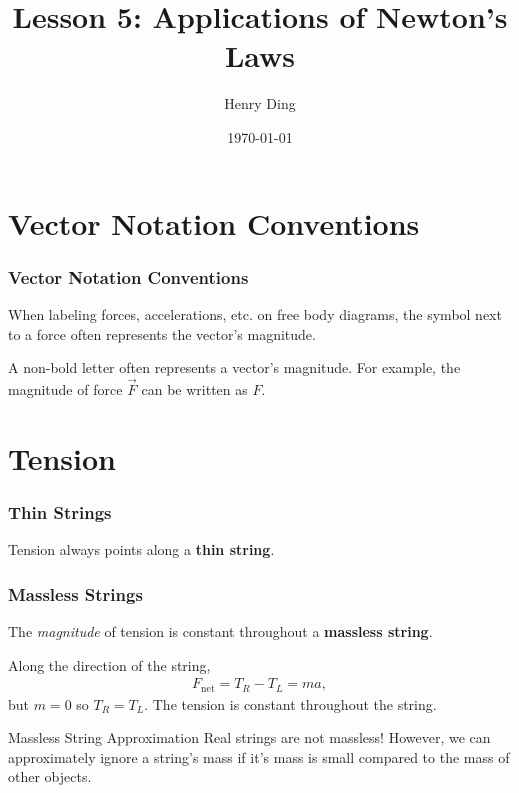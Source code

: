\documentclass[20pt]{beamer}
\author{Henry Ding}
\date{\today}
\title{Lesson 5: Applications of Newton's Laws}
\begin{document}
\frame{\titlepage}

\section{Vector Notation Conventions}

\begin{frame}
	\frametitle{Vector Notation Conventions}
	When labeling forces, accelerations, etc. on free body diagrams, the symbol next to a force often represents the vector's magnitude.

	A non-bold letter often represents a vector's magnitude. For example, the magnitude of force $\vec{F}$ can be written as $F$.
	\begin{figure}[ht]
		\centering
		\label{fig:vectornottation}
	\end{figure}
\end{frame}


\section{Tension}

\begin{frame}
	\frametitle{Thin Strings}
	\begin{definition}
		Tension always points along a \textbf{thin string}.
	\end{definition}
	\begin{figure}[ht]
		\centering
		\caption{}
	\end{figure}
\end{frame}

\begin{frame}
	\frametitle{Massless Strings}
	\begin{definition}
		The \textit{magnitude} of tension is constant throughout a \textbf{massless string}.
	\end{definition}
	\begin{figure}[ht]
		\centering
		\label{fig:masslessstring}
	\end{figure}
	\begin{theorem}
		Along the direction of the string,
		\begin{align*}
			F_\mathrm{net} = T_R - T_L = ma,
		\end{align*}
		but $m = 0$ so $T_R = T_L$. The tension is constant throughout the string.
	\end{theorem}
	\begin{alertblock}{Massless String Approximation} %
		Real strings are not massless! However, we can approximately ignore a string's mass if it's mass is small compared to the mass of other objects.
	\end{alertblock}
\end{frame}
\end{document}
